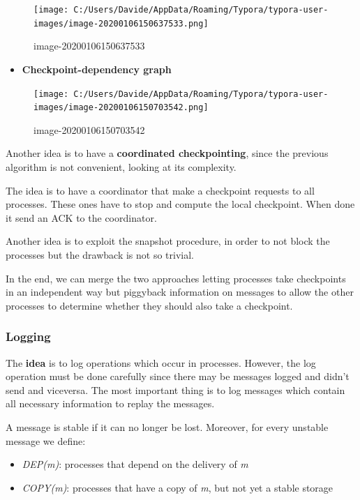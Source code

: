 \begin{figure}[htbp]
\centering
\texttt{[image: C:/Users/Davide/AppData/Roaming/Typora/typora-user-images/image-20200106150637533.png]}
\caption{image-20200106150637533}
\end{figure}

\begin{itemize}
\itemsep1pt\parskip0pt
\item
  \textbf{Checkpoint-dependency graph}
\end{itemize}

\begin{figure}[htbp]
\centering
\texttt{[image: C:/Users/Davide/AppData/Roaming/Typora/typora-user-images/image-20200106150703542.png]}
\caption{image-20200106150703542}
\end{figure}

Another idea is to have a \textbf{coordinated checkpointing}, since the
previous algorithm is not convenient, looking at its complexity.

The idea is to have a coordinator that make a checkpoint requests to all
processes. These ones have to stop and compute the local checkpoint.
When done it send an ACK to the coordinator.

Another idea is to exploit the snapshot procedure, in order to not block
the processes but the drawback is not so trivial.

In the end, we can merge the two approaches letting processes take
checkpoints in an independent way but piggyback information on messages
to allow the other processes to determine whether they should also take
a checkpoint.

\subsubsection{Logging}\label{logging}

The \textbf{idea} is to log operations which occur in processes.
However, the log operation must be done carefully since there may be
messages logged and didn't send and viceversa. The most important thing
is to log messages which contain all necessary information to replay the
messages.

A message is stable if it can no longer be lost. Moreover, for every
unstable message we define:

\begin{itemize}
\itemsep1pt\parskip0pt
\item
  \emph{DEP(m)}: processes that depend on the delivery of \emph{m}
\item
  \emph{COPY(m)}: processes that have a copy of \emph{m}, but not yet a
  stable storage
\end{itemize}

